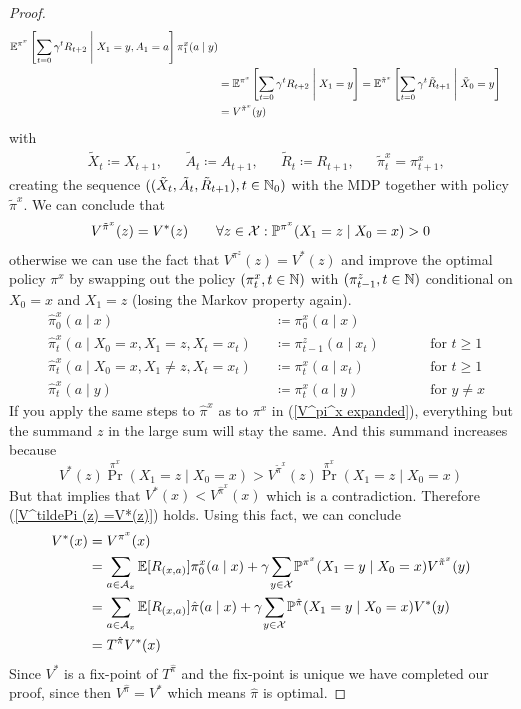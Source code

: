 \begin{proof}
\begin{align}
		\mathbb{E}^{\pi^x}\left[\sum_{t=0}\gamma^t R_{t+2}\;\middle|\; X_1=y, A_1=a\right]\pi^x_1(a\mid y)\nonumber\\
		&=\mathbb{E}^{\pi^x}\left[\sum_{t=0}\gamma^t R_{t+2}\;\middle|\; X_1=y\right]
		=\mathbb{E}^{\tilde{\pi}^x}\left[\sum_{t=0}\gamma^t \tilde{R}_{t+1}\;\middle|\; \tilde{X}_0=y\right]\nonumber\\
		&=V^{\tilde{\pi}^x}(y)
	\end{align}
	with 
	\begin{align*}
		&\tilde{X}_t\coloneqq X_{t+1}, &&\tilde{A}_t\coloneqq A_{t+1}, 
		&&\tilde{R}_t\coloneqq R_{t+1}, &&\tilde{\pi}^x_t=\pi^x_{t+1}, 
	\end{align*}
	creating the sequence 
	\(((\tilde{X}_t,\tilde{A}_t, \tilde{R}_{t+1}), t\in\mathbb{N}_0)\)  with the MDP together with policy \(\tilde{\pi}^x\). We can conclude that 
	\begin{align}
		V^{\tilde{\pi}^x}(z)=V^*(z) \qquad \forall z\in\mathcal{X}:\mathbb{P}^{\pi^x}(X_1=z\mid X_0=x)>0
		\label{V^tildePi (z) =V*(z)}
	\end{align}
	otherwise we can use the fact that \(V^{\pi^z}(z)=V^*(z)\) and improve the optimal policy \(\pi^x\) by swapping out the policy \((\pi^x_t, t\in\mathbb{N}) \) with \((\pi^z_{t-1}, t\in\mathbb{N})\) conditional on \(X_0=x\) and \(X_1=z\) (losing the Markov property again). 
	\begin{align*}
			&\hat{\pi}^x_0(a\mid x)&&\coloneqq \pi^x_0(a\mid x) \\
			&\hat{\pi}^x_t(a\mid X_0=x,X_1=z, X_t=x_t)&&\coloneqq \pi^z_{t-1}(a\mid x_t) 
			\qquad && \text{for } t\ge 1\\
			&\hat{\pi}^x_t(a\mid X_0=x, X_1\neq z, X_t=x_t)&&\coloneqq \pi^x_t(a\mid x_t) 
			&& \text{for } t\ge 1 \\
			&\hat{\pi}^x_t(a\mid y)&&\coloneqq \pi^x_t(a\mid y) 
			&& \text{for } y\neq x
	\end{align*}
	If you apply the same steps to \(\hat{\pi}^x\) as to \(\pi^x\) in (\ref{V^pi^x expanded}), everything but the summand \(z\) in the large sum will stay the same. And this summand increases because 
	\[
		V^*(z)\Pr^{\pi^x}(X_1=z\mid X_0=x)> V^{\tilde{\pi}^x}(z) \Pr^{\pi^x}(X_1=z\mid X_0=x)
	\]
	But that implies that \(V^*(x)< V^{\hat{\pi}^x}(x)\) which is a contradiction. Therefore (\ref{V^tildePi (z) =V*(z)}) holds. Using this fact, we can conclude
	\begin{align*}
		V^*(x)&=V^{\pi^x}(x)\\
		&=\sum_{a\in\cA_x}\E[R_{(x,a)}]\pi_0^x(a\mid x)+\gamma \smashoperator{\sum_{y\in\cX}}\Pr^{\pi^x}(X_1=y\mid X_0=x)
		V^{\tilde{\pi}^x}(y)\\
		&=\sum_{a\in\cA_x}\E[R_{(x,a)}]\hat{\pi}(a\mid x)+\gamma \smashoperator{\sum_{y\in\cX}}\Pr^{\hat{\pi}}(X_1=y\mid X_0=x) V^*(y)\\
		&=T^{\hat{\pi}} V^* (x)
	\end{align*}
	Since \(V^*\) is a fix-point of \(T^{\hat{\pi}}\) and the fix-point is unique we have completed our proof, since then \(V^{\hat{\pi}}=V^*\) which means \(\hat{\pi}\) is optimal. 
\end{proof}

